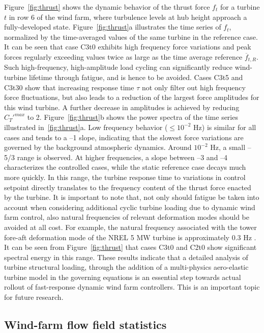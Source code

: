 Figure~\ref{fig:thrust} shows the dynamic behavior of the thrust force $f_t$ for a turbine $t$ in row 6 of the wind farm, where turbulence levels at hub height approach a fully-developed state. Figure~\ref{fig:thrust}a illustrates the time series of $f_t$, normalized by the time-averaged values of the same turbine in the reference case. It can be seen that case C3t0 exhibits high frequency force variations and peak forces regularly exceeding values twice as large as the time average reference $\overline{f}_{t,R}$. Such high-frequency, high-amplitude load cycling can significantly reduce wind-turbine lifetime through fatigue, and is hence to be avoided. Cases C3t5 and C3t30 show that increasing response time $\tau$ not only filter out high frequency force fluctuations, but also leads to a reduction of the largest force amplitudes for this wind turbine. A further decrease in amplitudes is achieved by reducing $C_T'^{max}$ to 2. Figure~\ref{fig:thrust}b shows the power spectra of the time series illustrated in~\ref{fig:thrust}a. Low frequency behavior ($\leq 10^{-2}$ Hz) is similar for all cases and tends to a --1 slope, indicating that the slowest force variations are governed by the background atmospheric dynamics. Around $10^{-2}$ Hz, a small --5/3 range is observed. At higher frequencies, a slope between --3 and --4 characterizes the controlled cases,  while the static reference case decays much more quickly. In this range, the turbine response time to variations in control setpoint directly translates to the frequency content of the thrust force enacted by the turbine. It is important to note that, not only should fatigue be taken into account when considering additional cyclic turbine loading due to dynamic wind farm control, also natural frequencies of relevant deformation modes should be avoided at all cost. For example, the natural frequency associated with the tower fore-aft deformation mode of the NREL 5 MW turbine is approximately 0.3 Hz \citep{jonkman2009definition}. It can be seen from Figure~\ref{fig:thrust} that cases C3t0 and C2t0 show significant spectral energy in this range. These results indicate that a detailed analysis of turbine structural loading, through the addition of a multi-physics aero-elastic turbine model in the governing equations is an essential step towards actual rollout of fast-response dynamic wind farm controllers. This is an important topic for future research.






\subsection{Wind-farm flow field statistics}\label{sec:opt_ind_flow}

